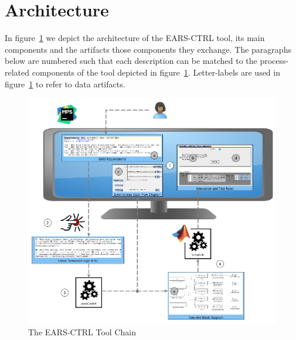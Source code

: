 \section{Architecture}
\vspace{-.3cm}In figure~\ref{fig:ears_ctrl_toolchain} we depict the architecture
of the \textsf{EARS-CTRL} tool, its main components and the artifacts those
components they exchange. The paragraphs below are numbered such that each
description can be matched to the process-related components of the tool depicted in
figure~\ref{fig:ears_ctrl_toolchain}.
Letter-labels are used in figure~\ref{fig:ears_ctrl_toolchain} to refer to data
artifacts.\\\vspace{-.9cm}
\begin{figure}[h!] 
   \begin{center}
     \includegraphics[width=.85\textwidth]{images/toolchain.png}
     \vspace{-.3cm}
     \caption{The \textsf{EARS-CTRL} Tool Chain}
     \label{fig:ears_ctrl_toolchain}
   \end{center}
      \vspace{-1.3cm}
 \end{figure}

